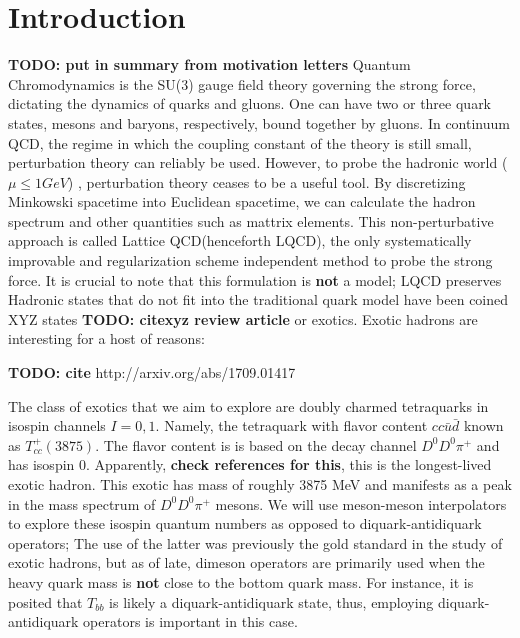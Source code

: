 
\chapter{Introduction}
\label{sec:intro}
\newcommand{\todo}[1]{\textbf{\color{red}TODO: #1}}

\todo{put in summary from motivation letters}
Quantum Chromodynamics is the SU(3) gauge field theory governing the strong force, dictating the dynamics of quarks and gluons. One can have two or three quark states, mesons and baryons, respectively, bound together by gluons. In continuum QCD, the regime in which the coupling constant of the theory is still small, perturbation theory can reliably be used. However, to probe the hadronic world ($\mu \leq 1 GeV$) , perturbation theory ceases to be a useful tool. By discretizing Minkowski spacetime into Euclidean spacetime, we can calculate the hadron spectrum and other quantities such as mattrix elements.
This non-perturbative approach is called Lattice QCD(henceforth LQCD), the only systematically improvable and regularization scheme independent method to probe the strong force. It is crucial to note that this formulation is \textbf{not} a model; LQCD preserves 
Hadronic states that do not fit into the traditional quark model have been coined XYZ states \todo{cite{xyz review article}} or exotics. Exotic hadrons are interesting for a host of reasons: 

\todo{cite} http://arxiv.org/abs/1709.01417

The class of exotics that we aim to explore are doubly charmed tetraquarks in isospin channels $I=0,1$. Namely, the tetraquark with flavor content $cc\bar{u}\bar{d}$ known as $T_{cc}^+(3875)$. The flavor content is is based on the decay channel $D^0D^0\pi^+$ and has isospin 0. Apparently, \textbf{check references for this}, this is the longest-lived exotic hadron. This exotic has mass of roughly 3875 MeV and manifests as a peak in the mass spectrum of $D^0D^0\pi^+$ mesons.  We will use meson-meson interpolators to explore these isospin quantum numbers as opposed to diquark-antidiquark operators; The use of the latter was previously the gold standard in the study of exotic hadrons, but as of late, dimeson operators are primarily used when the heavy quark mass is \textbf{not} close to the bottom quark mass. For instance, it is posited that $T_{bb}$ is likely a diquark-antidiquark state, thus, employing diquark-antidiquark operators is important in this case.  

